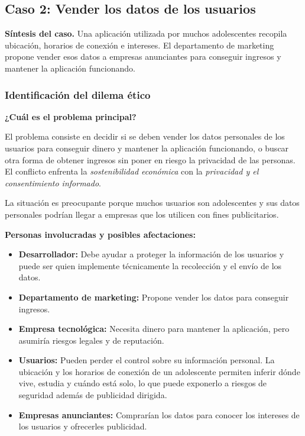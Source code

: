 \documentclass[12pt,a4paper,oneside]{article}
\newcommand{\rotulo}[1]{\par\Needspace{5\baselineskip}\noindent\textbf{#1}\par\nobreak}
\begin{document}
\subsection{Caso 2: Vender los datos de los usuarios}

\textbf{Síntesis del caso.} Una aplicación utilizada por muchos adolescentes recopila ubicación, horarios de conexión e intereses. El departamento de marketing propone vender esos datos a empresas anunciantes para conseguir ingresos y mantener la aplicación funcionando.

\subsubsection{Identificación del dilema ético}

\rotulo{¿Cuál es el problema principal?}

El problema consiste en decidir si se deben vender los datos personales de los usuarios para conseguir dinero y mantener la aplicación funcionando, o buscar otra forma de obtener ingresos sin poner en riesgo la privacidad de las personas. El conflicto enfrenta la \emph{sostenibilidad económica} con la \emph{privacidad y el consentimiento informado}.

La situación es preocupante porque muchos usuarios son adolescentes y sus datos personales podrían llegar a empresas que los utilicen con fines publicitarios.

\rotulo{Personas involucradas y posibles afectaciones:}

\begin{itemize}[leftmargin=1.8em,itemsep=3pt]
    \item \textbf{Desarrollador:} Debe ayudar a proteger la información de los usuarios y puede ser quien implemente técnicamente la recolección y el envío de los datos.
    \item \textbf{Departamento de marketing:} Propone vender los datos para conseguir ingresos.
    \item \textbf{Empresa tecnológica:} Necesita dinero para mantener la aplicación, pero asumiría riesgos legales y de reputación.
    \item \textbf{Usuarios:} Pueden perder el control sobre su información personal. La ubicación y los horarios de conexión de un adolescente permiten inferir dónde vive, estudia y cuándo está solo, lo que puede exponerlo a riesgos de seguridad además de publicidad dirigida.
    \item \textbf{Empresas anunciantes:} Comprarían los datos para conocer los intereses de los usuarios y ofrecerles publicidad.
\end{itemize}
\end{document}
